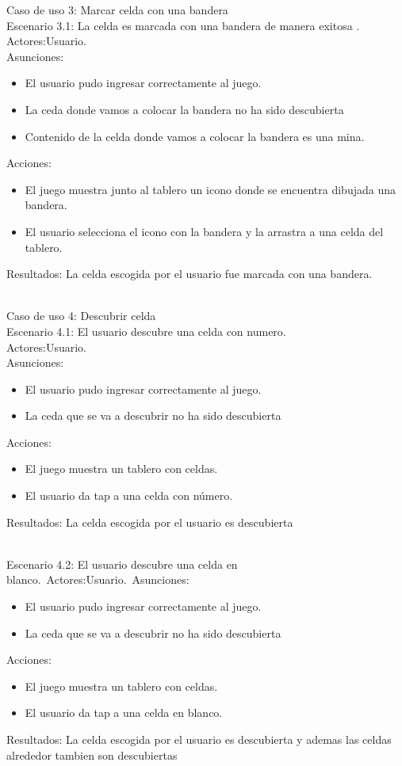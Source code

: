 \documentclass[11pt]{article} %
\begin{document}
Caso de uso 3: Marcar celda con una bandera
\\Escenario 3.1: La celda es marcada  con una bandera de manera exitosa .\
\\Actores:Usuario.\
\\Asunciones: 
\begin{itemize}
\item El usuario pudo ingresar correctamente al juego.
\item La ceda donde vamos a colocar la bandera no ha sido descubierta
\item Contenido de la celda donde vamos a colocar la bandera es una mina.
\end {itemize}
Acciones:
\begin{itemize}
\item El juego muestra junto al tablero un icono donde se encuentra dibujada una bandera.
\item El usuario selecciona el icono con la bandera y la arrastra a una celda del tablero. 
\end {itemize}
Resultados:
La celda escogida por el usuario fue marcada con una bandera.
\\ \

Caso de uso 4: Descubrir celda\
\\Escenario 4.1: El usuario descubre una celda con numero.\
\\Actores:Usuario.\
\\Asunciones: 
\begin{itemize}
\item El usuario pudo ingresar correctamente al juego.
\item La ceda que se va a descubrir no ha sido descubierta
\end {itemize}
Acciones:
\begin{itemize}
\item El juego muestra un tablero con celdas.
\item El usuario da tap a una celda con número. 
\end {itemize}
Resultados:
La celda escogida por el usuario es descubierta
\\ \

Escenario 4.2: El usuario descubre una celda en blanco.\
Actores:Usuario.\
Asunciones: 
\begin{itemize}
\item El usuario pudo ingresar correctamente al juego.
\item La ceda que se va a descubrir no ha sido descubierta
\end {itemize}
Acciones:
\begin{itemize}
\item El juego muestra un tablero con celdas.
\item El usuario da tap a una celda en blanco. 
\end {itemize}
Resultados:
La celda escogida por el usuario es descubierta y ademas las celdas alrededor tambien son descubiertas
\\ \
\end{document}
